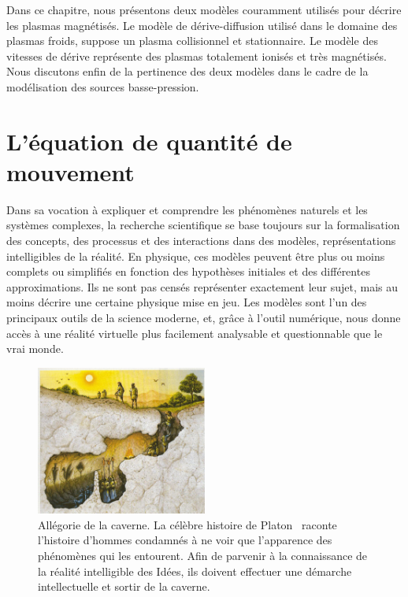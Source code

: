 
\label{ApproximationsEqMvt}
\begin{refsection}
Dans ce chapitre, nous présentons deux modèles couramment utilisés 
pour décrire les plasmas magnétisés. Le modèle de dérive-diffusion utilisé dans
le domaine des plasmas froids, suppose un plasma collisionnel et stationnaire.
Le modèle des vitesses de dérive représente des plasmas totalement ionisés et très
magnétisés. Nous discutons enfin de la pertinence des deux modèles dans le cadre
de la modélisation des sources basse-pression.

\section{L'équation de quantité de mouvement}

Dans sa vocation à expliquer et comprendre les phénomènes naturels et les
systèmes complexes, la recherche scientifique se base toujours sur la
formalisation des concepts, des processus et des interactions dans des
modèles, représentations intelligibles de la réalité. En physique, ces modèles
peuvent être plus ou moins complets ou simplifiés en fonction des hypothèses
initiales et des différentes approximations. Ils ne sont
pas censés représenter exactement leur sujet, mais au moins décrire une
certaine physique mise en jeu.
Les modèles sont l'un des
principaux outils de la science moderne, et, grâce à l'outil numérique, nous
donne accès à une réalité virtuelle plus facilement analysable et questionnable
que le vrai monde.

\begin{figure}[!htbp]
    \centering
	\includegraphics[width=0.5\textwidth]{figures/1-cave.jpg}
	\caption{Allégorie de la caverne. La célèbre histoire de
	Platon~\parencite{Platon} raconte l'histoire d'hommes condamnés à ne voir que
	l'apparence des phénomènes qui les entourent. Afin de parvenir à la connaissance de la réalité
	intelligible des Idées, ils doivent effectuer une démarche intellectuelle
	et sortir de la caverne.}\label{caverne}
\end{figure}



\end{refsection}
